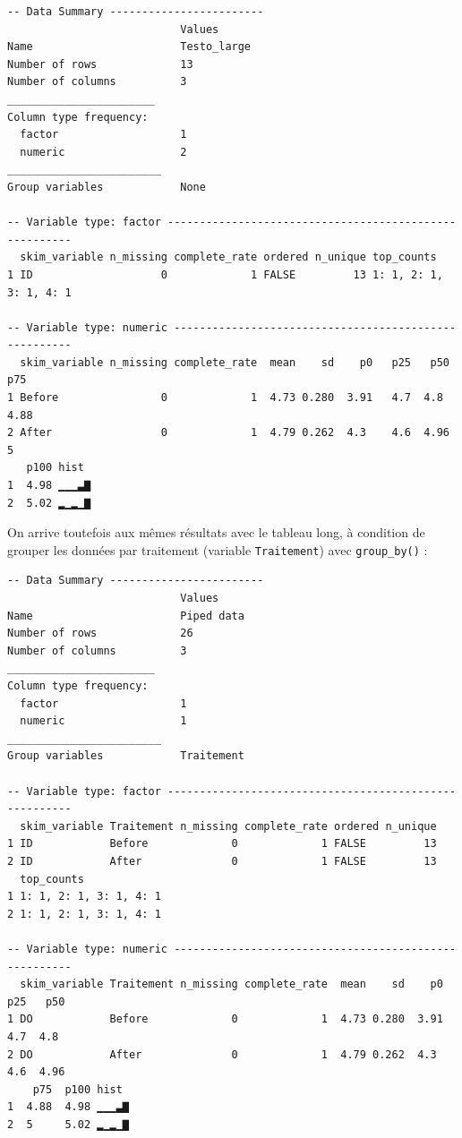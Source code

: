 \documentclass[
  a4paper,
]{article}
\newenvironment{Shaded}{\begin{snugshade}}{\end{snugshade}}
\newcommand{\KeywordTok}[1]{\textcolor[rgb]{0.12,0.11,0.11}{\textbf{#1}}}
\newcommand{\NormalTok}[1]{\textcolor[rgb]{0.12,0.11,0.11}{#1}}
\newcommand{\OperatorTok}[1]{\textcolor[rgb]{0.12,0.11,0.11}{#1}}
\newcommand{\StringTok}[1]{\textcolor[rgb]{0.75,0.01,0.01}{#1}}
\begin{document}
\begin{verbatim}
-- Data Summary ------------------------
                           Values     
Name                       Testo_large
Number of rows             13         
Number of columns          3          
_______________________               
Column type frequency:                
  factor                   1          
  numeric                  2          
________________________              
Group variables            None       

-- Variable type: factor -------------------------------------------------------
  skim_variable n_missing complete_rate ordered n_unique top_counts            
1 ID                    0             1 FALSE         13 1: 1, 2: 1, 3: 1, 4: 1

-- Variable type: numeric ------------------------------------------------------
  skim_variable n_missing complete_rate  mean    sd    p0   p25   p50   p75
1 Before                0             1  4.73 0.280  3.91   4.7  4.8   4.88
2 After                 0             1  4.79 0.262  4.3    4.6  4.96  5   
   p100 hist 
1  4.98 ▁▁▁▃▇
2  5.02 ▂▁▂▁▇
\end{verbatim}

On arrive toutefois aux mêmes résultats avec le tableau long, à condition de grouper les données par traitement (variable \texttt{Traitement}) avec \texttt{group\_by()} :

\begin{Shaded}
\end{Shaded}

\begin{verbatim}
-- Data Summary ------------------------
                           Values    
Name                       Piped data
Number of rows             26        
Number of columns          3         
_______________________              
Column type frequency:               
  factor                   1         
  numeric                  1         
________________________             
Group variables            Traitement

-- Variable type: factor -------------------------------------------------------
  skim_variable Traitement n_missing complete_rate ordered n_unique
1 ID            Before             0             1 FALSE         13
2 ID            After              0             1 FALSE         13
  top_counts            
1 1: 1, 2: 1, 3: 1, 4: 1
2 1: 1, 2: 1, 3: 1, 4: 1

-- Variable type: numeric ------------------------------------------------------
  skim_variable Traitement n_missing complete_rate  mean    sd    p0   p25   p50
1 DO            Before             0             1  4.73 0.280  3.91   4.7  4.8 
2 DO            After              0             1  4.79 0.262  4.3    4.6  4.96
    p75  p100 hist 
1  4.88  4.98 ▁▁▁▃▇
2  5     5.02 ▂▁▂▁▇
\end{verbatim}
\end{document}
